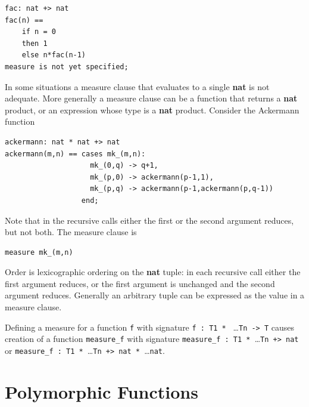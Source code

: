 \documentclass{overturerepchap}
\newcommand{\keyw}[1]{{\bf\ttfamily #1}}
\begin{document}
\begin{lstlisting}
fac: nat +> nat
fac(n) ==
    if n = 0
    then 1
    else n*fac(n-1)
measure is not yet specified;
\end{lstlisting}

In some situations a measure clause that evaluates to a single \keyw{nat} is not adequate. More generally a measure clause can be a function that returns a \keyw{nat} product, or an expression whose type is a \keyw{nat} product. Consider the Ackermann function

\begin{lstlisting}
ackermann: nat * nat +> nat
ackermann(m,n) == cases mk_(m,n):
                    mk_(0,q) -> q+1,
                    mk_(p,0) -> ackermann(p-1,1),
                    mk_(p,q) -> ackermann(p-1,ackermann(p,q-1))
                  end; 
\end{lstlisting}

Note that in the recursive calls either the first or the second argument reduces, but not both. The measure clause is

\begin{lstlisting}
measure mk_(m,n)
\end{lstlisting}

Order is lexicographic ordering on the \keyw{nat} tuple: in each recursive call either the first argument reduces, or the first argument is unchanged and the second argument reduces. Generally an arbitrary tuple can be expressed as the value in a measure clause.

Defining a measure for a function {\tt f} with signature {\tt f : T1 * } \ldots {\tt * Tn -> T} causes creation of a function {\tt measure\_f} with signature
{\tt measure\_f : T1 * }\ldots{\tt * Tn +> nat} or
{\tt measure\_f : T1 * }\ldots{\tt * Tn +> nat * }\ldots{\tt * nat}.

\section{Polymorphic Functions}
\end{document}
